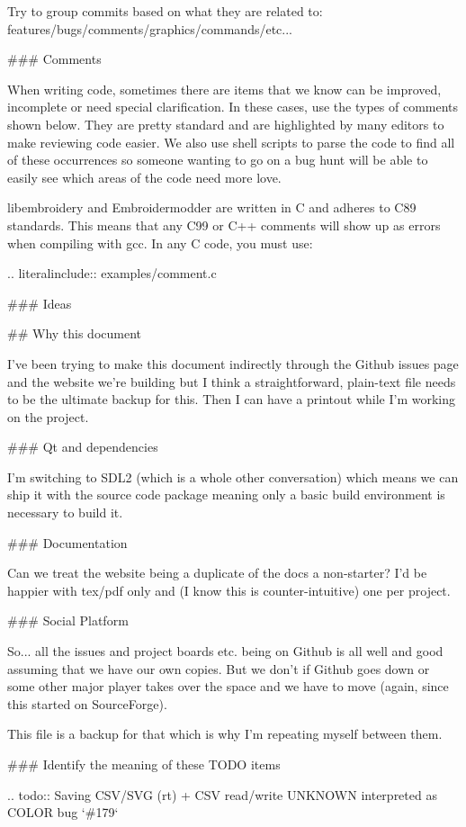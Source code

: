 Try to group commits based on what they are related to:
features/bugs/comments/graphics/commands/etc...

### Comments

When writing code, sometimes there are items that we know can be
improved, incomplete or need special clarification. In these cases, use
the types of comments shown below. They are pretty standard and are
highlighted by many editors to make reviewing code easier. We also use
shell scripts to parse the code to find all of these occurrences so
someone wanting to go on a bug hunt will be able to easily see which
areas of the code need more love.

libembroidery and Embroidermodder are written in C and adheres to C89 standards. This means
that any C99 or C++ comments will show up as errors when compiling with
gcc. In any C code, you must use:

.. literalinclude:: examples/comment.c

### Ideas

## Why this document

I've been trying to make this document indirectly through the Github
issues page and the website we're building but I think a
straightforward, plain-text file needs to be the ultimate backup for
this. Then I can have a printout while I'm working on the project.

### Qt and dependencies

I'm switching to SDL2 (which is a whole other conversation) which means
we can ship it with the source code package meaning only a basic build
environment is necessary to build it.

### Documentation

Can we treat the website being a duplicate of the docs a non-starter?
I'd be happier with tex/pdf only and (I know this is counter-intuitive)
one per project.

### Social Platform

So... all the issues and project boards etc. being on Github is all
well and good assuming that we have our own copies. But we don't if
Github goes down or some other major player takes over the space and we
have to move (again, since this started on SourceForge).

This file is a backup for that which is why I'm repeating myself between
them.

### Identify the meaning of these TODO items

.. todo::
   Saving CSV/SVG (rt) + CSV read/write UNKNOWN interpreted as COLOR bug `\#179`

